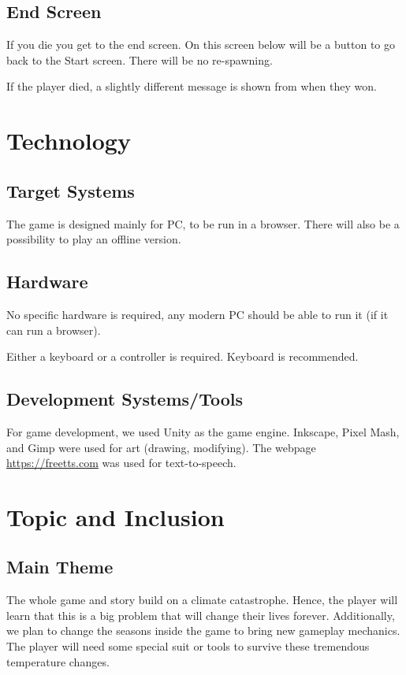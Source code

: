 \documentclass[a4paper]{scrreprt}
\begin{document}
\section{End Screen}
If you die you get to the end screen. On this screen below will be a button to go back to the Start screen. There will be no re-spawning.

If the player died, a slightly different message is shown from when they won.



\chapter{Technology}

\section{Target Systems}
The game is designed mainly for PC, to be run in a browser. There will also be a possibility to play an offline version.

\section{Hardware}
No specific hardware is required, any modern PC should be able to run it (if it can run a browser).

Either a keyboard or a controller is required. Keyboard is recommended.

\section{Development Systems/Tools}
For game development, we used Unity as the game engine. Inkscape, Pixel Mash, and Gimp were used for art (drawing, modifying). The webpage \url{https://freetts.com} was used for text-to-speech.



\chapter{Topic and Inclusion}

\section{Main Theme}
The whole game and story build on a climate catastrophe. Hence, the player will learn that this is a big problem that will change their lives forever. Additionally, we plan to change the seasons inside the game to bring new gameplay mechanics. The player will need some special suit or tools to survive these tremendous temperature changes.
\end{document}
